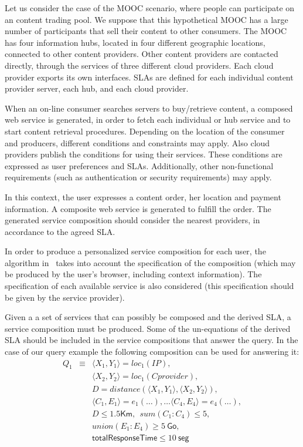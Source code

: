 \begin{example}\label{Ex:rew1}
Let us consider the case of the MOOC scenario, where people can participate on an content trading pool.
We suppose that this hypothetical MOOC has a large number of participants that sell their content  to other consumers. 
The MOOC has four information hubs, located in four different geographic locations, connected to other content providers.
Other content providers are  contacted directly, through the services of three different cloud providers.
Each cloud provider exports its own interfaces.
 SLAs are defined for each individual content provider server, each hub, and each cloud provider. 

When an on-line consumer searches  servers to buy/retrieve content, a composed web service is generated, in order to fetch each individual or hub service and to start  content retrieval procedures.
Depending on the location of the consumer and producers, different conditions and constraints may apply.
Also  cloud providers  publish the conditions for using their services.
These conditions are expressed as user preferences and SLAs.
Additionally, other non-functional requirements (such as authentication or security requirements) may apply.

In this context, the user  expresses a content order, her location and payment information. A composite web service is  generated to fulfill the order.
The generated service composition should consider the nearest providers, in accordance to the agreed SLA.

In order to produce a personalized service composition for each user, the algorithm in~\cite{CostaAMR13} takes into account the specification of the composition (which may be produced by the user's browser, including context information).
The specification of each available service is also considered (this specification should be given by the service provider).
~\hfill\openbox
\end{example}


Given a a set of services that can possibly be composed and the derived SLA, a service composition must be produced.
Some of the un-equations of the derived SLA should be included in the service compositions that answer the query.
In the case of our query example the following composition can be used for answering it:
\begin{eqnarray*}
Q_1 &\equiv&
   \langle X_1,Y_1\rangle = loc_1(IP), \\
&& \langle X_2,Y_2 \rangle = loc_1(Cprovider), \\
&& D = distance(\langle X_1,Y_1\rangle, \langle X_2,Y_2\rangle), \\
&& \langle C_1, E_1 \rangle = e_1(\dots), \dots \langle C_4, E_4 \rangle = e_4(\dots), \\
&& D \leq 1.5 \mathsf{Km},\ \ sum(C_1:C_4) \leq 5, \\
&& union(E_1:E_4) \geq 5\ \mathsf{Go}, \\
&& \mathsf{totalResponseTime}  \leq 10\ \mathsf{seg}
\end{eqnarray*}

